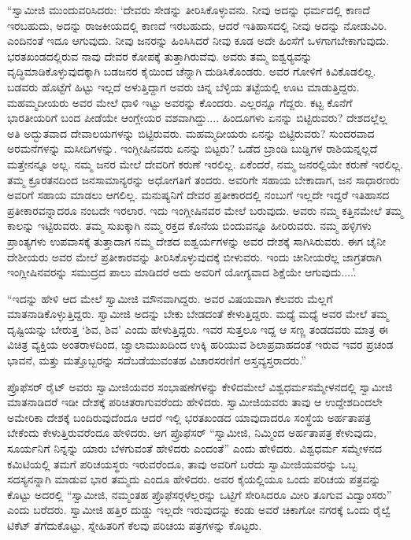  “ಸ್ವಾಮೀಜಿ ಮುಂದುವರಿಸಿದರು: ‘ದೇವರು ಸೇಡನ್ನು ತೀರಿಸಿಕೊಳ್ಳುವನು. ನೀವು ಅದನ್ನು ಧರ್ಮದಲ್ಲಿ ಕಾಣದೆ ಇರಬಹುದು, ಅದನ್ನು ರಾಜಕೀಯದಲ್ಲಿ ಕಾಣದೆ ಇರಬಹುದು, ಆದರೆ ಇತಿಹಾಸದಲ್ಲಿ ನೀವು ಅದನ್ನು ನೋಡುವಿರಿ. ಎಂದಿನಂತೆ ಇದೂ ಆಗುವುದು. ನೀವು ಜನರನ್ನು ಹಿಂಸಿಸಿದರೆ ನೀವು ಕೂಡ ಅದೇ ಹಿಂಸೆಗೆ ಒಳಗಾಗಬೇಕಾಗುವುದು. ಭರತಖಂಡದಲ್ಲಿರುವ ನಾವು ದೇವರ ಕೋಪಕ್ಕೆ ತುತ್ತಾಗಿರುವೆವು. ಅವರು ತಮ್ಮ ಐಶ್ವರ‍್ಯವನ್ನು ವೃದ್ಧಿಮಾಡಿಕೊಳ್ಳುವುದಕ್ಕಾಗಿ ಬಡಜನರ ಕೈಯಿಂದ ಚೆನ್ನಾಗಿ ದುಡಿಸಿಕೊಂಡರು. ಅವರ ಗೋಳಿಗೆ ಕಿವಿಕೊಡಲಿಲ್ಲ. ಬಡವರು ಹೊಟ್ಟೆಗೆ ಹಿಟ್ಟು ಇಲ್ಲದೆ ಅಳುತ್ತಿದ್ದಾಗ ಅವರು ಚಿನ್ನ ಬೆಳ್ಳಿಯ ತಟ್ಟೆಯಲ್ಲಿ ಊಟ ಮಾಡುತ್ತಿದ್ದರು. ಮಹಮ್ಮದೀಯರು ಅವರ ಮೇಲೆ ಧಾಳಿ ಇಟ್ಟು ಅವರನ್ನು ಕೊಂದರು. ಎಲ್ಲರನ್ನೂ ಗೆದ್ದರು. ಕಟ್ಟ ಕೊನೆಗೆ ಭಾರತೀಯರಿಗೆ ಬಂದ ಪೀಡೆಯೇ ಆಂಗ್ಲೇಯರ ವಶವಾಗಿದ್ದು.... ಹಿಂದೂಗಳು ಏನನ್ನು ಬಿಟ್ಟಿರುವರು? ದೇಶದಲ್ಲೆಲ್ಲ ಅತಿ ಅದ್ಭುತವಾದ ದೇವಾಲಯಗಳನ್ನು ಬಿಟ್ಟಿರುವರು. ಮಹಮ್ಮದೀಯರು ಏನನ್ನು ಬಿಟ್ಟಿರುವರು? ಸುಂದರವಾದ ಅರಮನೆಗಳನ್ನು ಮಸೀದಿಗಳನ್ನು. ಇಂಗ್ಲೀಷಿನವರು ಏನನ್ನು ಬಿಟ್ಟರು? ಒಡೆದ ಬ್ರಾಂಡಿ ಬುಡ್ಡಿಗಳ ರಾಶಿಯನ್ನಲ್ಲದೆ ಮತ್ತೇನನ್ನೂ ಅಲ್ಲ. ನಮ್ಮ ಜನರ ಮೇಲೆ ದೇವರಿಗೆ ಕರುಣೆ ಇರಲಿಲ್ಲ. ಏಕೆಂದರೆ, ನಮ್ಮ ಜನರಲ್ಲಿಯೇ ಕರುಣೆ ಇರಲಿಲ್ಲ. ತಮ್ಮ ಕ್ರೂರತನದಿಂದ ಜನಸಾಮಾನ್ಯರನ್ನು ಅಧೋಗತಿಗೆ ತಂದರು. ಅವರಿಗೇ ಸಹಾಯ ಬೇಕಾದಾಗ, ಜನ ಸಾಧಾರಣರು ಅವರಿಗೆ ಸಹಾಯ ಮಾಡಲು ಆಗಲಿಲ್ಲ. ಮನುಷ್ಯನಿಗೆ ದೇವರ ಪ್ರತೀಕಾರದಲ್ಲಿ ನಂಬುಗೆ ಇಲ್ಲದೇ ಇದ್ದರೆ ಇತಿಹಾಸದ ಪ್ರತೀಕಾರವನ್ನಾದರೂ ನಂಬದೇ ಇರಲಾರ. ಇದು ಇಂಗ್ಲೀಷಿನವರ ಮೇಲೆ ಬರುವುದು. ಅವರು ನಮ್ಮ ಕತ್ತಿನಮೇಲೆ ತಮ್ಮ ಕಾಲನ್ನು ಇಟ್ಟಿರುವರು. ತಮ್ಮ ಸುಖಕ್ಕಾಗಿ ನಮ್ಮ ರಕ್ತದ ಕೊನೆಯ ಬಿಂದುವನ್ನೂ ಹೀರಿರುವರು. ನಮ್ಮ ಹಳ್ಳಿಗಳು ಪ್ರಾಂತ್ಯಗಳು ಉಪವಾಸಕ್ಕೆ ತುತ್ತಾದಾಗ ನಮ್ಮ ದೇಶದ ಐಶ್ವರ್ಯಗಳನ್ನು ಅವರ ದೇಶಕ್ಕೆ ಸಾಗಿಸಿರುವರು. ಈಗ ಚೈನೀ ದೇಶೀಯರು ಅವರ ಮೇಲೆ ಪ್ರತೀಕಾರವನ್ನು ತೀರಿಸಿಕೊಳ್ಳುವುದಕ್ಕೆ ಬೀಳುವರು. ಇಂದು ಚೀನೀಯರೆಲ್ಲ ಜಾಗ್ರತರಾಗಿ ಇಂಗ್ಲೀಷಿನವರನ್ನು ಸಮುದ್ರದ ಪಾಲು ಮಾಡಿದರೆ ಅದು ಅವರಿಗೆ ಯೋಗ್ಯವಾದ ಶಿಕ್ಷೆಯೇ ಆಗುವುದು....’. 

 “ಇದನ್ನು ಹೇಳಿ ಆದ ಮೇಲೆ ಸ್ವಾಮೀಜಿ ಮೌನವಾಗಿದ್ದರು. ಅವರ ವಿಷಯವಾಗಿ ಕೆಲವರು ಮೆಲ್ಲಗೆ ಮಾತನಾಡಿಕೊಳ್ಳುತ್ತಿದ್ದರು. ಸ್ವಾಮೀಜಿ ಅದನ್ನು ಬೇಕು ಬೇಡದಂತೆ ಕೇಳುತ್ತಿದ್ದರು. ಮಧ್ಯೆ ಮಧ್ಯೆ ಅವರ ಮೇಲೆ ತಮ್ಮ ದೃಷ್ಟಿಯನ್ನು ಬೇರುತ್ತ ‘ಶಿವ, ಶಿವ’ ಎಂದು ಹೇಳುತ್ತಿದ್ದರು. ಇವರ ಸುತ್ತಲೂ ಇದ್ದ ಆ ಸಣ್ಣ ತಂಡದವರು ಮಾತ್ರ ಈ ವಿಚಿತ್ರ ವ್ಯಕ್ತಿಯ ಅಂತರಾಳದಿಂದ, ಜ್ವಾಲಾಮುಖದಿಂದ ಉಕ್ಕಿ ಹರಿಯುವ ಶಿಲಾಪ್ರವಾಹದಂತೆ ಇರುವ ಇವರ ಪ್ರಚಂಡ ಭಾವನೆ, ಮತ್ತು ಮತ್ತೊಬ್ಬರನ್ನು ಸದೆಬಡೆಯುವಂತಹ ವಿಚಾರಸರಣಿಗೆ ಅಸ್ತವ್ಯಸ್ತರಾದರು.” 

 ಪ್ರೊಫೆಸರ್ ರೈಟ್ ಅವರು ಸ್ವಾಮೀಜಿಯವರ ಸಂಭಾಷಣೆಗಳನ್ನು ಕೇಳಿದಮೇಲೆ ವಿಶ್ವಧರ್ಮಸಮ್ಮೇಳನದಲ್ಲಿ ಸ್ವಾಮೀಜಿ ಮಾತನಾಡಿದರೆ ಇಡೀ ದೇಶಕ್ಕೆ ಪರಿಚಿತರಾಗುವರೆಂದು ಹೇಳಿದರು. ಸ್ವಾಮೀಜಿಯವರು ತಾವು ಆ ಉದ್ದೇಶದಿಂದಲೇ ಅಮೇರಿಕಾ ದೇಶಕ್ಕೆ ಬಂದಿರುವುದೆಂದೂ ಆದರೆ ಇಲ್ಲಿ ಭರತಖಂಡದ ಯಾವುದಾದರೂ ಸಂಸ್ಥೆಯ ಅರ್ಹತಾಪತ್ರ ಬೇಕೆಂದು ಕೇಳುತ್ತಿರುವರೆಂದೂ ಹೇಳಿದರು. ಆಗ ಪ್ರೊಫೆಸರ್ “ಸ್ವಾಮೀಜಿ, ನಿಮ್ಮಿಂದ ಅರ್ಹತಾಪತ್ರ ಕೇಳುವುದು, ಸೂರ್ಯನಿಗೆ ನಿನ್ನನ್ನು ಯಾರು ಬೆಳಗುವಂತೆ ಹೇಳಿದರು ಎಂದಂತೆ” ಎಂದು ಹೇಳಿದರು. ವಿಶ್ವಧರ್ಮ ಸಮ್ಮೇಳನದ ಕಮಿಟಿಯಲ್ಲಿ ತಮಗೆ ಪರಿಚಯಸ್ಥರು ಇರುವರೆಂದೂ, ತಾವು ಅವರಿಗೆ ಬರೆದು ಸ್ವಾಮೀಜಿಯವರನ್ನು ಒಬ್ಬ ಸದಸ್ಯನನ್ನಾಗಿ ಮಾಡುವ ಭಾರ ತಮ್ಮದು ಎಂದೂ ಹೇಳಿದರು. ಅವರ ಕೈಯಲ್ಲಿಯೂ ಒಂದು ಪರಿಚಯ ಪತ್ರವನ್ನು ಕೊಟ್ಟು ಅದರಲ್ಲಿ “ಸ್ವಾಮೀಜಿ, ನಮ್ಮಂತಹ ಪ್ರೊಫೆಸರ್‍ಗಳೆಲ್ಲರನ್ನು ಒಟ್ಟಿಗೆ ಸೇರಿಸಿದರೂ ಮೀರಿ ತೂಗುವ ವಿದ್ವಾಂಸರು” ಎಂದು ಬರೆದರು. ಸ್ವಾಮೀಜಿ ಹತ್ತಿರ ದುಡ್ಡು ಇಲ್ಲದೇ ಇರುವುದನ್ನು ಕಂಡು ಅವರೆ ಚಿಕಾಗೋ ನಗರಕ್ಕೆ ಒಂದು ರೈಲ್ವೆ ಟಿಕೆಟ್ ತೆಗೆದುಕೊಟ್ಟು, ಸ್ನೇಹಿತರಿಗೆ ಕೆಲವು ಪರಿಚಯ ಪತ್ರಗಳನ್ನು ಕೊಟ್ಟರು. 

